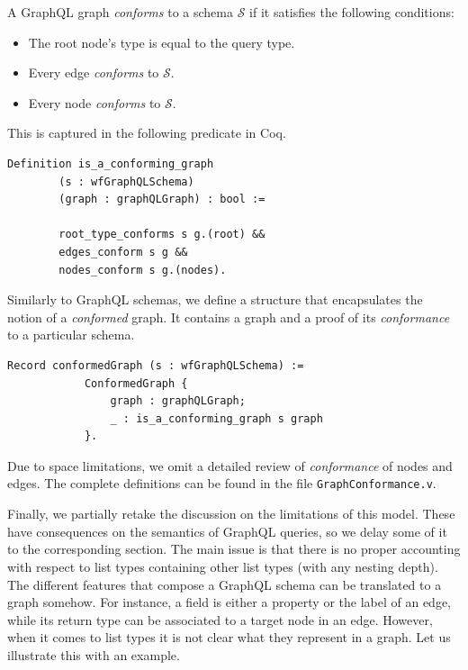 \begin{definition}
A GraphQL graph \textit{conforms} to a schema $\mathcal{S}$ if it satisfies the following conditions:
\begin{itemize}
    \item The root node's type is equal to the query type.
    \item Every edge \textit{conforms} to $\mathcal{S}$.
    \item Every node \textit{conforms} to $\mathcal{S}$.
\end{itemize}
\end{definition}

This is captured in the following predicate in Coq.
\begin{verbatim}
Definition is_a_conforming_graph
        (s : wfGraphQLSchema)
        (graph : graphQLGraph) : bool :=

        root_type_conforms s g.(root) &&
        edges_conform s g &&
        nodes_conform s g.(nodes).
\end{verbatim}

Similarly to GraphQL schemas, we define a structure that encapsulates the notion of a \textit{conformed} graph. It contains a graph and a proof of its \textit{conformance} to a particular schema.

\begin{verbatim}
Record conformedGraph (s : wfGraphQLSchema) :=
            ConformedGraph {
                graph : graphQLGraph;
                _ : is_a_conforming_graph s graph
            }.
\end{verbatim}

Due to space limitations, we omit a detailed review of \textit{conformance} of nodes and edges. The complete definitions can be found in the file \texttt{GraphConformance.v}. %

Finally, we partially retake the discussion on the limitations of this model. These have consequences on the semantics of GraphQL queries, so we delay some of it to the corresponding section. The main issue is that there is no proper accounting with respect to list types containing other list types (with any nesting depth). The different features that compose a GraphQL schema can be translated to a graph somehow. For instance, a field is either a property or the label of an edge, while its return type can be associated to a target node in an edge. However, when it comes to list types it is not clear what they represent in a graph. Let us illustrate this with an example.

